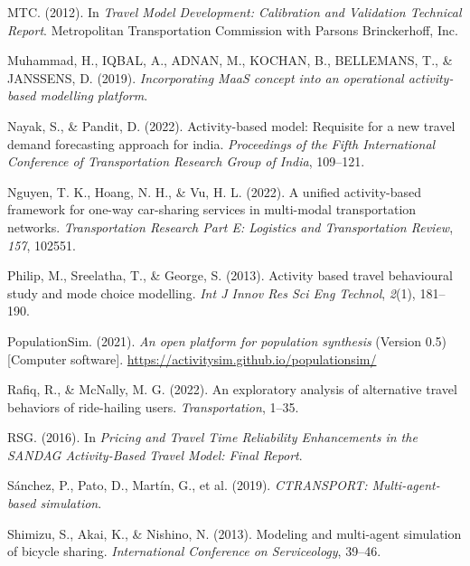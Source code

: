 \documentclass[fancy, masters]{byuthesis}
\newlength{\cslhangindent}
\newlength{\cslentryspacingunit} %
\newenvironment{CSLReferences}[2] %
 {%
  \setlength{\parindent}{0pt}
  \ifodd #1
  \let\oldpar\par
  \def\par{\hangindent=\cslhangindent\oldpar}
  \fi
  \setlength{\parskip}{#2\cslentryspacingunit}
 }%
 {}
\begin{document}
\begin{CSLReferences}{1}{0}
\leavevmode{}%
MTC. (2012). In \emph{Travel Model Development: Calibration and Validation Technical Report}. Metropolitan Transportation Commission with Parsons Brinckerhoff, Inc.

\leavevmode{}%
Muhammad, H., IQBAL, A., ADNAN, M., KOCHAN, B., BELLEMANS, T., \& JANSSENS, D. (2019). \emph{Incorporating MaaS concept into an operational activity-based modelling platform}.

\leavevmode{}%
Nayak, S., \& Pandit, D. (2022). Activity-based model: Requisite for a new travel demand forecasting approach for india. \emph{Proceedings of the Fifth International Conference of Transportation Research Group of India}, 109--121.

\leavevmode{}%
Nguyen, T. K., Hoang, N. H., \& Vu, H. L. (2022). A unified activity-based framework for one-way car-sharing services in multi-modal transportation networks. \emph{Transportation Research Part E: Logistics and Transportation Review}, \emph{157}, 102551.

\leavevmode{}%
Philip, M., Sreelatha, T., \& George, S. (2013). Activity based travel behavioural study and mode choice modelling. \emph{Int J Innov Res Sci Eng Technol}, \emph{2}(1), 181--190.

\leavevmode{}%
PopulationSim. (2021). \emph{An open platform for population synthesis} (Version 0.5) {[}Computer software{]}. \url{https://activitysim.github.io/populationsim/}

\leavevmode{}%
Rafiq, R., \& McNally, M. G. (2022). An exploratory analysis of alternative travel behaviors of ride-hailing users. \emph{Transportation}, 1--35.

\leavevmode{}%
RSG. (2016). In \emph{Pricing and Travel Time Reliability Enhancements in the SANDAG Activity-Based Travel Model: Final Report}.

\leavevmode{}%
Sánchez, P., Pato, D., Martín, G., et al. (2019). \emph{CTRANSPORT: Multi-agent-based simulation}.

\leavevmode{}%
Shimizu, S., Akai, K., \& Nishino, N. (2013). Modeling and multi-agent simulation of bicycle sharing. \emph{International Conference on Serviceology}, 39--46.


\end{CSLReferences}
\end{document}
